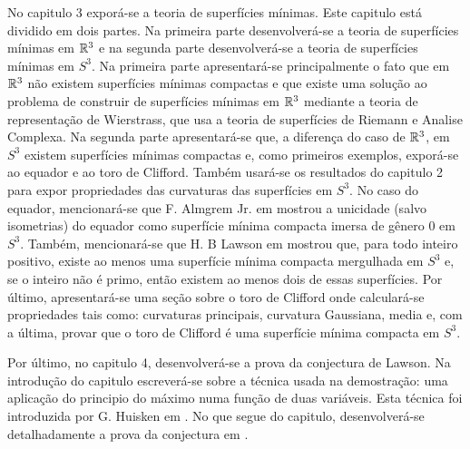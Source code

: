 No capitulo 3 exporá-se a teoria de superfícies mínimas. Este capitulo está dividido em dois partes. Na primeira parte desenvolverá-se a teoria de superfícies mínimas em $\mathbb R^3$ e na segunda parte desenvolverá-se a teoria de superfícies mínimas em $S^3$. Na primeira parte apresentará-se principalmente o fato que em $\mathbb R^3$ não existem superfícies mínimas compactas e que existe uma solução ao problema de construir de superfícies mínimas em $\mathbb R^3$ mediante a teoria de representação de Wierstrass, que usa a teoria de superfícies de Riemann e Analise Complexa. Na segunda parte apresentará-se que, a diferença do caso de $\mathbb R^3$, em $S^3$ existem superfícies mínimas compactas e, como primeiros exemplos, exporá-se ao equador e ao toro de Clifford. 
Também usará-se os resultados do capitulo 2 para expor propriedades das curvaturas das superfícies em $S^3$.
No caso do equador, mencionará-se que F. Almgrem Jr. em \cite{Almgren1966} mostrou a unicidade (salvo isometrias) do equador como superfície mínima compacta imersa de gênero 0 em $S^3$. 
Também, mencionará-se que H. B Lawson em \cite{Lawson1970} mostrou que, para todo inteiro positivo, existe ao menos uma superfície mínima compacta mergulhada em $S^3$ e, se o inteiro não é primo, então existem ao menos dois de essas superfícies.
Por último, apresentará-se uma seção sobre o toro de Clifford onde calculará-se propriedades tais como: curvaturas principais, curvatura Gaussiana, media e, com a última, provar que o toro de Clifford é uma superfície mínima compacta em $S^3$. 

Por último, no capitulo 4, desenvolverá-se a prova da conjectura de Lawson.
Na introdução do capitulo escreverá-se sobre a técnica usada na demostração: uma aplicação do principio do máximo numa função de duas variáveis.
Esta técnica foi introduzida por G. Huisken em \cite{Huisken1998}.
No que segue do capitulo, desenvolverá-se detalhadamente a prova da conjectura em \cite{Brendle2013a}.